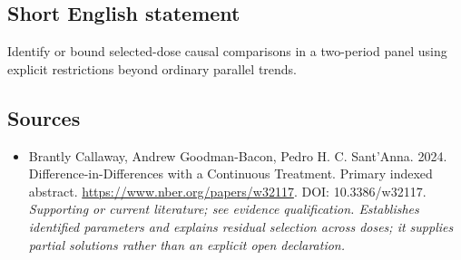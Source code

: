\documentclass[11pt]{article}
\begin{document}
\subsection{Short English statement}
Identify or bound selected-dose causal comparisons in a two-period panel using explicit restrictions beyond ordinary parallel trends.

\subsection{Sources}
\begin{itemize}\raggedright
\item[\textnormal{[S1]}]\hypertarget{source:30007705:1}{} Brantly Callaway, Andrew Goodman-Bacon, Pedro H. C. Sant'Anna. 2024. Difference-in-Differences with a Continuous Treatment. Primary indexed abstract.
\url{https://www.nber.org/papers/w32117}.
DOI: 10.3386/w32117.
{\small\textit{Supporting or current literature; see evidence qualification. Establishes identified parameters and explains residual selection across doses; it supplies partial solutions rather than an explicit open declaration.}}
\end{itemize}
\end{document}
